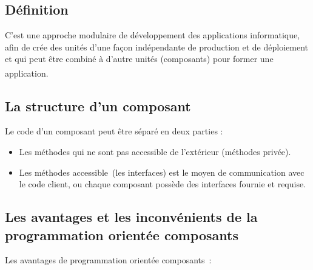 \documentclass[12pt]{report}
\begin{document}
\subsection{Définition}
\vspace{0.1in}
C’est une approche modulaire de développement des applications informatique, afin de crée des unités d’une façon indépendante de production et de déploiement et qui peut être combiné à d’autre unités (composants) pour former une application. \textsuperscript{\cite{stephane2002poo}}

\subsection{La structure d’un composant}
\vspace{0.1in}
Le code d’un composant peut être séparé en deux parties :

\begin{itemize}
    \item Les méthodes qui ne sont pas accessible de l’extérieur (méthodes privée).
    \item Les méthodes accessible (les interfaces) est le moyen de communication avec le code client, ou chaque composant possède des interfaces fournie et requise.
\end{itemize}

\subsection{Les avantages et les inconvénients de la programmation orientée composants}
\vspace{0.1in}
Les avantages de programmation orientée composants :
\end{document}
